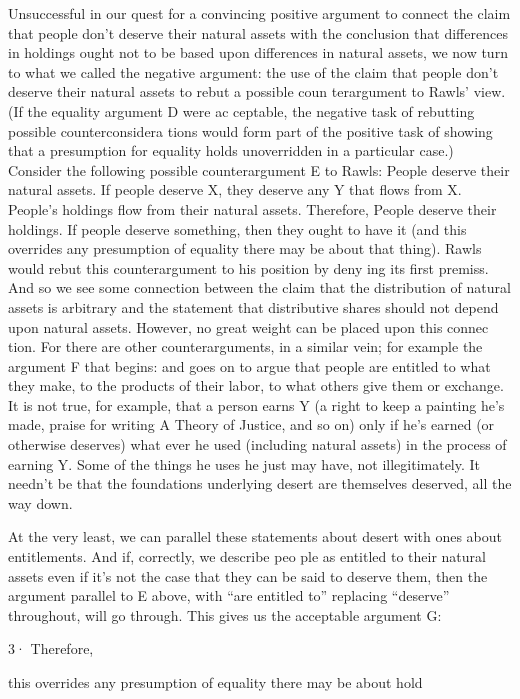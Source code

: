 \documentclass[11pt,openany]{book}
\begin{document}
Unsuccessful in our quest for a convincing positive argument to connect the claim that people don't deserve their natural assets with the conclusion that differences in holdings ought not to be based upon differences in natural assets, we now turn to what we called the negative argument: the use of the claim that people don't deserve their natural assets to rebut a possible coun terargument to Rawls' view. (If the equality argument D were ac ceptable, the negative task of rebutting possible counterconsidera tions would form part of the positive task of showing that a presumption for equality holds unoverridden in a particular case.) Consider the following possible counterargument E to Rawls: People deserve their natural assets. If people deserve X, they deserve any Y that flows from X. People's holdings flow from their natural assets. Therefore, People deserve their holdings. If people deserve something, then they ought to have it (and this overrides any presumption of equality there may be about that thing). Rawls would rebut this counterargument to his position by deny ing its first premiss. And so we see some connection between the claim that the distribution of natural assets is arbitrary and the statement that distributive shares should not depend upon natural assets. However, no great weight can be placed upon this connec tion. For there are other counterarguments, in a similar vein; for example the argument F that begins: and goes on to argue that people are entitled to what they make, to the products of their labor, to what others give them or exchange. It is not true, for example, that a person earns Y (a right to keep a painting he's made, praise for writing A Theory of Justice, and so on) only if he's earned (or otherwise deserves) what ever he used (including natural assets) in the process of earning Y. Some of the things he uses he just may have, not illegitimately. It needn't be that the foundations underlying desert are themselves deserved, all the way down. 

At the very least, we can parallel these statements about desert with ones about entitlements. And if, correctly, we describe peo ple as entitled to their natural assets even if it's not the case that they can be said to deserve them, then the argument parallel to E above, with ``are entitled to'' replacing ``deserve'' throughout, will go through. This gives us the acceptable argument G: 

3· Therefore, 

this overrides any presumption of equality there may be about hold
\end{document}
